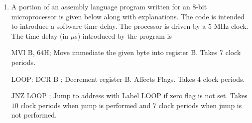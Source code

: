 \documentclass{article}
\begin{document}
\begin{enumerate}
    \item A portion of an assembly language program written for an $8$-bit microprocessor is given below along with explanations. The code is intended to introduce a software time delay. The processor is driven by a $5$ MHz clock. The time delay (in $\mu$s) introduced by the program is \vspace{12 pt}


MVI B, $64$H; Move immediate the given byte into register B. Takes $7$ clock periods.\vspace{12 pt}


LOOP: DCR B ; Decrement register B. Affects Flags. Takes $4$ clock periods. \vspace{12 pt}


JNZ LOOP ; Jump to address with Label LOOP if zero flag is not set. Takes $10$ clock periods when jump is performed and $7$ clock periods when jump is not performed.
\end{enumerate}
\end{document}
